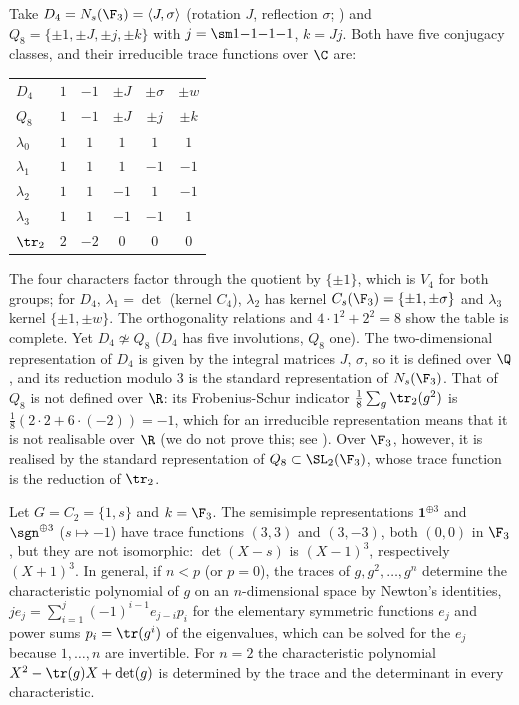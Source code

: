 \begin{example}\label{ex:reps:tables}
Take $D_4=N_s(\F_3)=\langle J,\sigma\rangle$ (rotation $J$, reflection $\sigma$; ) and $Q_8=\{\pm1,\pm J,\pm j,\pm k\}$ with $j=\sm1{-1}{-1}{-1}$, $k=Jj$.
Both have five conjugacy classes, and their irreducible trace functions over $\C$ are:
\begin{center}
\begin{tabular}{lccccc}
\toprule
$D_4$ & $1$ & $-1$ & $\pm J$ & $\pm\sigma$ & $\pm w$\\
$Q_8$ & $1$ & $-1$ & $\pm J$ & $\pm j$ & $\pm k$\\
\midrule
$\lambda_0$ & $1$ & $1$ & $1$ & $1$ & $1$\\
$\lambda_1$ & $1$ & $1$ & $1$ & $-1$ & $-1$\\
$\lambda_2$ & $1$ & $1$ & $-1$ & $1$ & $-1$\\
$\lambda_3$ & $1$ & $1$ & $-1$ & $-1$ & $1$\\
$\tr_2$ & $2$ & $-2$ & $0$ & $0$ & $0$\\
\bottomrule
\end{tabular}
\end{center}
The four characters factor through the quotient by $\{\pm1\}$, which is $V_4$ for both groups; for $D_4$, $\lambda_1=\det$ (kernel $C_4$), $\lambda_2$ has kernel
$C_s(\F_3)=\{\pm1,\pm\sigma\}$ and $\lambda_3$ kernel $\{\pm1,\pm w\}$. The orthogonality relations and $4\cdot1^2+2^2=8$ show the table is complete. Yet
$D_4\not\simeq Q_8$ ($D_4$ has five involutions, $Q_8$ one). The two-dimensional representation of $D_4$ is given by the integral matrices $J$, $\sigma$,
so it is defined over $\Q$, and its reduction modulo $3$ is the standard representation of $N_s(\F_3)$. That of $Q_8$ is not defined over
$\R$: its Frobenius-Schur indicator $\frac18\sum_g\tr_2(g^2)$ is $\frac18(2\cdot2+6\cdot(-2))=-1$, which for an irreducible representation means that it
is not realisable over $\R$ (we do not prove this; see \cite[Section 13.2]{SerreLinearReps}). Over $\F_3$, however, it is realised by the
standard representation of $Q_8\subset\SL_2(\F_3)$, whose trace function is the reduction of $\tr_2$.
\end{example}

\begin{example}\label{ex:reps:traces-fail}
Let $G=C_2=\{1,s\}$ and $k=\F_3$. The semisimple representations $\mathbf1^{\oplus3}$ and $\sgn^{\oplus3}$ ($s\mapsto-1$) have trace functions $(3,3)$ and
$(3,-3)$, both $(0,0)$ in $\F_3$, but they are not isomorphic: $\det(X-s)$ is $(X-1)^3$, respectively $(X+1)^3$. In general, if $n<p$ (or
$p=0$), the traces of $g,g^2,\dots,g^n$ determine the characteristic polynomial of $g$ on an $n$-dimensional space by Newton's identities,
$je_j=\sum_{i=1}^{j}(-1)^{i-1}e_{j-i}p_i$ for the elementary symmetric functions $e_j$ and power sums $p_i=\tr(g^i)$ of the eigenvalues, which
can be solved for the $e_j$ because $1,\dots,n$ are invertible. For $n=2$ the characteristic polynomial $X^2-\tr(g)X+\det(g)$ is determined
by the trace and the determinant in every characteristic.
\end{example}

